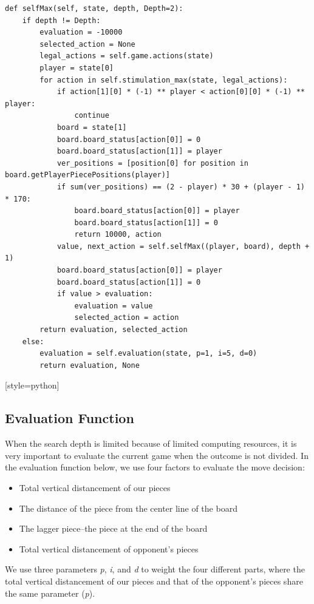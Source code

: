 \documentclass[aps,letterpaper,10pt]{article}
\begin{document}
\begin{lstlisting}[style=python]
def selfMax(self, state, depth, Depth=2):
	if depth != Depth:
		evaluation = -10000
		selected_action = None
		legal_actions = self.game.actions(state)
		player = state[0]
		for action in self.stimulation_max(state, legal_actions):
			if action[1][0] * (-1) ** player < action[0][0] * (-1) ** player:
				continue
			board = state[1]
			board.board_status[action[0]] = 0
			board.board_status[action[1]] = player
			ver_positions = [position[0] for position in board.getPlayerPiecePositions(player)]
			if sum(ver_positions) == (2 - player) * 30 + (player - 1) * 170:
				board.board_status[action[0]] = player
				board.board_status[action[1]] = 0
				return 10000, action
			value, next_action = self.selfMax((player, board), depth + 1)
			board.board_status[action[0]] = player
			board.board_status[action[1]] = 0
			if value > evaluation:
				evaluation = value
				selected_action = action
		return evaluation, selected_action
	else:
		evaluation = self.evaluation(state, p=1, i=5, d=0)
		return evaluation, None
\end{lstlisting}[style=python]



\subsection{Evaluation Function}
When the search depth is limited because of limited computing resources, it is very important to evaluate the current game when the outcome is not divided.
In the evaluation function below, we use four factors to evaluate the move decision:
\begin{itemize}
\item Total vertical distancement of our pieces
\item The distance of the piece from the center line of the board
\item The lagger piece--the piece at the end of the board
\item Total vertical distancement of opponent's pieces
\end{itemize}

We use three parameters {\itshape p}, {\itshape i}, and {\itshape d} to weight the four different parts, where the total vertical distancement of our pieces and that of the opponent's pieces share the same parameter ({\itshape p}).
\end{document}

